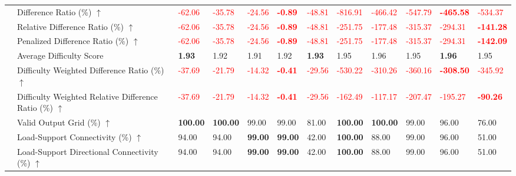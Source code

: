 \begin{table}[!h]
{\begin{tabular}{lllllll|lllll}
 & Difference Ratio (\%) $\uparrow$ & \textcolor{red}{-62.06} & \textcolor{red}{-35.78} & \textcolor{red}{-24.56} & \textbf{\textcolor{red}{-0.89}} & \textcolor{red}{-48.81} & \textcolor{red}{-816.91} & \textcolor{red}{-466.42} & \textcolor{red}{-547.79} & \textbf{\textcolor{red}{-465.58}} & \textcolor{red}{-534.37} \\
 & Relative Difference Ratio (\%) $\uparrow$ & \textcolor{red}{-62.06} & \textcolor{red}{-35.78} & \textcolor{red}{-24.56} & \textbf{\textcolor{red}{-0.89}} & \textcolor{red}{-48.81} & \textcolor{red}{-251.75} & \textcolor{red}{-177.48} & \textcolor{red}{-315.37} & \textcolor{red}{-294.31} & \textbf{\textcolor{red}{-141.28}} \\
 & Penalized Difference Ratio (\%) $\uparrow$ & \textcolor{red}{-62.06} & \textcolor{red}{-35.78} & \textcolor{red}{-24.56} & \textbf{\textcolor{red}{-0.89}} & \textcolor{red}{-48.81} & \textcolor{red}{-251.75} & \textcolor{red}{-177.48} & \textcolor{red}{-315.37} & \textcolor{red}{-294.31} & \textbf{\textcolor{red}{-142.09}} \\
 & Average Difficulty Score & \textbf{1.93} & 1.92 & 1.91 & 1.92 & \textbf{1.93} & 1.95 & 1.96 & 1.95 & \textbf{1.96} & 1.95 \\
 & Difficulty Weighted Difference Ratio (\%) $\uparrow$ & \textcolor{red}{-37.69} & \textcolor{red}{-21.79} & \textcolor{red}{-14.32} & \textbf{\textcolor{red}{-0.41}} & \textcolor{red}{-29.56} & \textcolor{red}{-530.22} & \textcolor{red}{-310.26} & \textcolor{red}{-360.16} & \textbf{\textcolor{red}{-308.50}} & \textcolor{red}{-345.92} \\
 & Difficulty Weighted Relative Difference Ratio (\%) $\uparrow$ & \textcolor{red}{-37.69} & \textcolor{red}{-21.79} & \textcolor{red}{-14.32} & \textbf{\textcolor{red}{-0.41}} & \textcolor{red}{-29.56} & \textcolor{red}{-162.49} & \textcolor{red}{-117.17} & \textcolor{red}{-207.47} & \textcolor{red}{-195.27} & \textbf{\textcolor{red}{-90.26}} \\
 & Valid Output Grid (\%) $\uparrow$ & \textbf{100.00} & \textbf{100.00} & 99.00 & 99.00 & 81.00 & \textbf{100.00} & \textbf{100.00} & 99.00 & 96.00 & 76.00 \\
 & Load-Support Connectivity (\%) $\uparrow$ & 94.00 & 94.00 & \textbf{99.00} & \textbf{99.00} & 42.00 & \textbf{100.00} & 88.00 & 99.00 & 96.00 & 51.00 \\
 & Load-Support Directional Connectivity (\%) $\uparrow$ & 94.00 & 94.00 & \textbf{99.00} & \textbf{99.00} & 42.00 & \textbf{100.00} & 88.00 & 99.00 & 96.00 & 51.00 \\

\end{tabular}}
\end{table}
